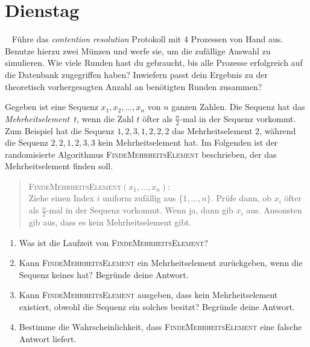 \documentclass{uebung_cs}
\begin{document}
\section*{Dienstag}

\begin{exercise}\
	Führe das \textit{contention resolution} Protokoll mit $4$ Prozessen von Hand aus. Benutze hierzu zwei Münzen und werfe sie, um die zufällige Auswahl zu simulieren.
	Wie viele Runden hast du gebraucht, bis alle Prozesse erfolgreich auf die Datenbank zugegriffen haben?
	Inwiefern passt dein Ergebnis zu der theoretisch vorhergesagten Anzahl an benötigten Runden zusammen?
\end{exercise}    

\begin{exercise}[Mehrheit][\href{https://moodle.studiumdigitale.uni-frankfurt.de/moodle/mod/assign/view.php?id=239323}{moodle}\athome]
	Gegeben ist eine Sequenz $x_1,x_2,\dots,x_n$ von $n$ ganzen Zahlen. Die Sequenz hat das \textit{Mehrheitselement}~$t$, wenn die Zahl $t$ öfter als $\frac{n}{2}$-mal in der Sequenz vorkommt. Zum Beispiel hat die Sequenz $1,2,3,1,2,2,2$ das Mehrheitselement $2$, während die Sequenz $2,2,1,2,3,3$ kein Mehrheitselement hat. Im Folgenden ist der randomisierte Algorithmus \textsc{FindeMehrheitsElement} beschrieben, der das Mehrheitselement finden soll.
	
	\begin{quote}
		\textsc{FindeMehrheitsElement}$(x_1,\dots,x_n)$: \\
		Ziehe einen Index $i$ uniform zufällig aus $\{1,\dots,n\}$. Prüfe dann, ob $x_i$ öfter als $\frac{n}{2}$-mal in der Sequenz vorkommt. Wenn ja, dann gib $x_i$ aus. Ansonsten gib aus, dass es kein Mehrheitselement gibt.
	\end{quote}
	\begin{enumerate}
		\item\easy Was ist die Laufzeit von \textsc{FindeMehrheitsElement}?
		\item\easy Kann \textsc{FindeMehrheitsElement} ein Mehrheitselement zurückgeben, wenn die Sequenz keines hat? Begründe deine Antwort.
		\item\easy Kann \textsc{FindeMehrheitsElement} ausgeben, dass kein Mehrheitselement existiert, obwohl die Sequenz ein solches besitzt? Begründe deine Antwort.
		\item\medium Bestimme die Wahrscheinlichkeit, dass \textsc{FindeMehrheitsElement} eine falsche Antwort liefert.
	\end{enumerate}
\end{exercise}
\end{document}
